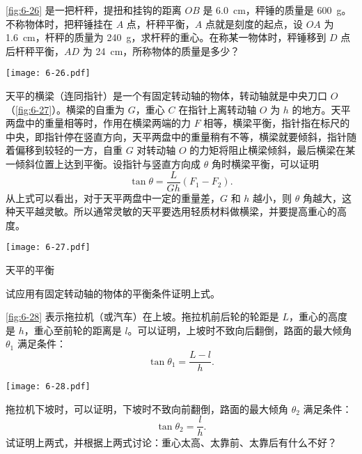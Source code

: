 \begin{Exercise}
\begin{question}
\item  \cref{fig:6-26} 是一把杆秤，提扭和挂钩的距离 $OB$ 是 \qty{6.0}{cm}，秤锤的质量是 \qty{600}{g}。不称物体时，把秤锤挂在 $A$ 点，杆秤平衡，$A$ 点就是刻度的起点，设 $OA$ 为 \qty{1.6}{cm}，杆秤的质量为 \qty{240}{g}，求杆秤的重心。在称某一物体时，秤锤移到 $D$ 点后杆秤平衡，$AD$ 为 \qty{24}{cm}，所称物体的质量是多少？
\begin{figurehere}
  \begin{minipage}{\linewidth}\centering
    \texttt{[image: 6-26.pdf]}
    \caption{}\label{fig:6-26}
  \end{minipage}
\end{figurehere}
\item 天平的横梁（连同指针）是一个有固定转动轴的物体，转动轴就是中央刀口 $O$（\cref{fig:6-27}）。横梁的自重为 $G$，重心 $C$ 在指针上离转动轴 $O$ 为 $h$ 的地方。天平两盘中的重量相等时，作用在横梁两端的力 $F$ 相等，横梁平衡，指针指在标尺的中央，即指针停在竖直方向，天平两盘中的重量稍有不等，横梁就要倾斜，指针随着偏移到较轻的一方，自重 $G$ 对转动轴 $O$ 的力矩将阻止横梁倾斜，最后横梁在某一倾斜位置上达到平衡。设指针与竖直方向成 $\theta$ 角时横梁平衡，可以证明
\[\tan\theta =\frac{L}{Gh}(F_1-F_2).\]
从上式可以看出，对于天平两盘中一定的重量差，$G$ 和 $h$ 越小，则 $\theta$ 角越大，这种天平越灵敏。所以通常灵敏的天平要选用轻质材料做横梁，并要提高重心的高度。
\begin{figurehere}
  \begin{minipage}{\linewidth}\centering
    \texttt{[image: 6-27.pdf]}
    \caption{天平的平衡}\label{fig:6-27}
  \end{minipage}
\end{figurehere}
试应用有固定转动轴的物体的平衡条件证明上式。

\item  \cref{fig:6-28} 表示拖拉机（或汽车）在上坡。拖拉机前后轮的轮距是 $L$，重心的高度是 $h$，重心至前轮的距离是 $l$。可以证明，上坡时不致向后翻倒，路面的最大倾角 $\theta_1$ 满足条件：
\[\tan\theta_1=\frac{L-l}{h}.\]
\begin{figurehere}
  \begin{minipage}{\linewidth}
    \centering\texttt{[image: 6-28.pdf]}
    \caption{}\label{fig:6-28}
  \end{minipage}
\end{figurehere}
拖拉机下坡时，可以证明，下坡时不致向前翻倒，路面的最大倾角 $\theta_2$ 满足条件：
\[\tan\theta_2=\frac{l}{h}.\]
试证明上两式，并根据上两式讨论：重心太高、太靠前、太靠后有什么不好？
\end{question}
\end{Exercise}
